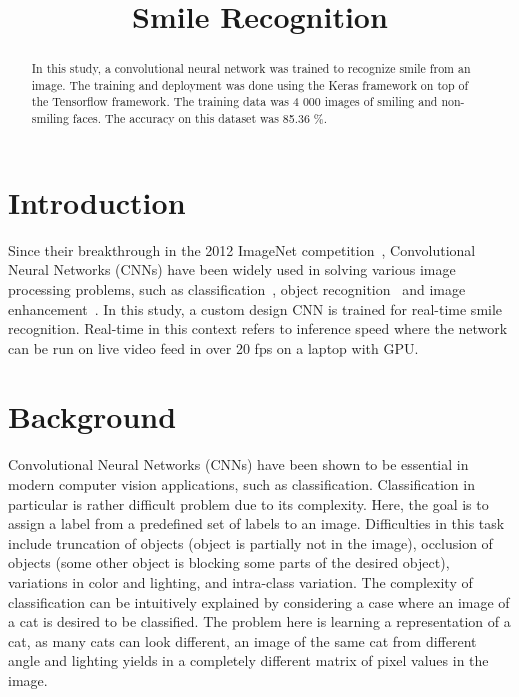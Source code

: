 \documentclass{article}
\title{Smile Recognition}
\begin{document}
\maketitle
\sloppy

\begin{abstract}
In this study, a convolutional neural network was trained to recognize
smile from an image. The training and deployment was done using the
Keras framework on top of the Tensorflow framework. The training data
was 4 000 images of smiling and non-smiling faces. The accuracy on
this dataset was 85.36 \%.
\end{abstract}

\section{Introduction}\label{sec:intro}
Since their breakthrough in the 2012 ImageNet
competition~\cite{krizhevsky_2017}, Convolutional Neural Networks
(CNNs) have been widely used in solving various image processing
problems, such as classification~\cite{krizhevsky_2017}, object
recognition~\cite{yolov3} and image enhancement~\cite{wang_2019}. In
this study, a custom design CNN is trained for real-time smile
recognition. Real-time in this context refers to inference speed where
the network can be run on live video feed in over 20 fps on a laptop
with GPU\@.

\section{Background}\label{sec:background}
Convolutional Neural Networks (CNNs) have been shown to be essential
in modern computer vision applications, such as classification.
Classification in particular is rather difficult problem due to its
complexity. Here, the goal is to assign a label from a predefined set
of labels to an image. Difficulties in this task include truncation of
objects (object is partially not in the image), occlusion of objects
(some other object is blocking some parts of the desired object),
variations in color and lighting, and intra-class variation. The
complexity of classification can be intuitively explained by
considering a case where an image of a cat is desired to be
classified. The problem here is learning a representation of a cat, as
many cats can look different, an image of the same cat from different
angle and lighting yields in a completely different matrix of pixel
values in the image.~\cite{cs231n}
\end{document}
